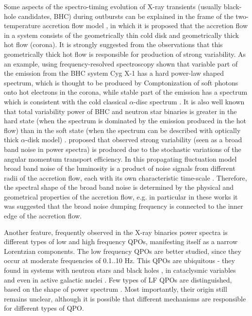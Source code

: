 \documentclass[a4paper,fleqn,usenatbib]{mnras}
\begin{document}
Some aspects of the spectro-timing evolution of X-ray transients (usually black-hole candidates, BHC) during outbursts can be explained in the frame of the two-temperature accretion flow model \citep{1975ApJ...199L.153E, 1976ApJ...204..187S, 1995ApJ...452..710N}, in which it is proposed that the accretion flow in a system consists of the geometrically thin cold disk and geometrically thick hot flow (corona). 
It is strongly suggested from the observations that this geometrically thick hot flow is responsible for production of strong variability. 
As an example, using frequency-resolved spectroscopy \citet{2001MNRAS.321..759C} shown that variable part of the emission from the BHC system Cyg X-1 has a hard power-law shaped spectrum, which is thought to be produced by Comptonization of soft photons onto hot electrons in the corona, while stable part of the emission has a spectrum which is consistent with the cold classical $\alpha$-disc spectrum \citep{shakura73}.  
It is also well known that total variability power of BHC and neutron star binaries is greater in the hard state (when the spectrum is dominated by the emission produced in the hot flow) than in the soft state (when the spectrum can be described with optically thick $\alpha$-disk model) \citep[][e.t.c.]{1992ApJ...391L..21M, 2000A&A...363.1013R, 2001ApJS..132..377H, 2001MNRAS.321..759C}. 
\citet{1997MNRAS.292..679L} proposed that observed strong variability (seen as a broad band noise in power spectra) is produced due to the stochastic variations of the angular momentum transport efficiency. 
In this propagating fluctuation model broad band noise of the luminosity is a product of noise signals from different radii of the accretion flow, each with its own characteristic time-scale \citep[see, e.g.][]{2006MNRAS.367..801A, 2013MNRAS.434.1476I}. 
Therefore, the spectral shape of the broad band noise is determined by the physical and geometrical properties of the accretion flow, e.g. in particular in these works it was suggested that the broad noise dumping frequency is connected to the inner edge of the accretion flow. 

Another feature, frequently observed in the X-ray binaries power spectra is different types of low and high frequency QPOs, manifesting itself as a narrow Lorentzian components. The low frequency QPOs are better studied, since they occur at moderate frequencies of 0.1..10 Hz. This QPOs are ubiquitous - they found in systems with neutron stars and black holes \citep{wijnands99}, in cataclysmic variables \citep{mauche02} and even in active galactic nuclei \citep{gierlinskiy08}. Few types of LF QPOs are distinguished, based on the shape of power spectrum \citep[see, e.g.][]{casella05}. Most importantly, their origin still remains unclear, although it is possible that different mechanisms are responsible for different types of QPO.
\end{document}
